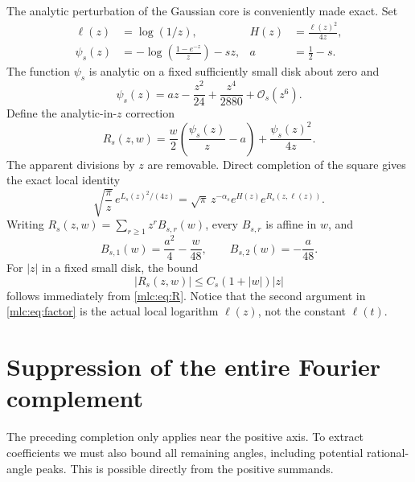 \documentclass[11pt]{article}
\theoremstyle{remark}\newtheorem{remark}[theorem]{Remark}
\newcommand{\OO}{\mathcal O}
\begin{document}
The analytic perturbation of the Gaussian core is conveniently made exact. Set
\begin{align}
 \ell(z)&=\log(1/z),& H(z)&=\frac{\ell(z)^2}{4z},\label{mlc:eq:H}\\
 \psi_s(z)&=-\log\left(\frac{1-e^{-z}}z\right)-sz,&
 a&=\frac12-s.\label{mlc:eq:psi}
\end{align}
The function $\psi_s$ is analytic on a fixed sufficiently small disk about zero and
\begin{equation}\label{mlc:eq:psiseries}
 \psi_s(z)=az-\frac{z^2}{24}+\frac{z^4}{2880}+\OO_s(z^6).
\end{equation}
Define the analytic-in-$z$ correction
\begin{equation}\label{mlc:eq:R}
 R_s(z,w)=\frac w2\left(\frac{\psi_s(z)}z-a\right)
                   +\frac{\psi_s(z)^2}{4z}.
\end{equation}
The apparent divisions by $z$ are removable. Direct completion of the square gives the exact local identity
\begin{equation}\label{mlc:eq:factor}
 \sqrt{\frac\pi z}\,e^{L_s(z)^2/(4z)}
    =\sqrt\pi\,z^{-\alpha_s}e^{H(z)}e^{R_s(z,\ell(z))}.
\end{equation}
Writing $R_s(z,w)=\sum_{r\ge1}z^rB_{s,r}(w)$, every $B_{s,r}$ is affine in $w$, and
\begin{equation}\label{mlc:eq:B12}
 B_{s,1}(w)=\frac{a^2}4-\frac w{48},\qquad
 B_{s,2}(w)=-\frac a{48}.
\end{equation}
For $|z|$ in a fixed small disk, the bound
\begin{equation}\label{mlc:eq:Rbound}
 |R_s(z,w)|\le C_s(1+|w|)|z|
\end{equation}
follows immediately from \eqref{mlc:eq:R}. Notice that the second argument in \eqref{mlc:eq:factor} is the actual local logarithm $\ell(z)$, not the constant $\ell(t)$.

\section{Suppression of the entire Fourier complement}\label{mlc:sec:global}
The preceding completion only applies near the positive axis. To extract coefficients we must also bound all remaining angles, including potential rational-angle peaks. This is possible directly from the positive summands.
\end{document}
